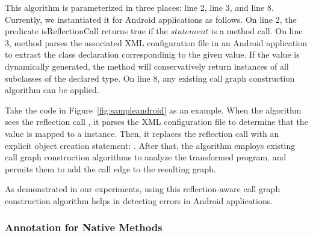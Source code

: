 This algorithm is parameterized in three places:
line 2, line 3, and line 8. Currently, we instantiated it
for Android applications as follows. On line 2,
the predicate isReflectionCall returns true
if the $statement$ is a  method call. On line 3, method
 parses the associated XML configuration
file in an Android application to extract the class declaration
 correspondinig to the given  value. If the 
value is dynamically generated, the method will conservatively
return instances of all subclasses of the declared type.
On line 8, any existing call graph construction algorithm can be applied.

Take the code in Figure~\ref{fig:sampleandroid} as an example.
When the algorithm sees the reflection call
, it
parses the XML configuration file to determine that the 
value is mapped to a  instance. Then, it
replaces the reflection call
with an explicit object creation statement: .
After that, the algorithm employs existing call graph construction
algorithms to analyze the transformed program, and permits them
to add the call edge  to the resulting graph.

As demonstrated in our experiments, using this reflection-aware call
graph construction algorithm helps in detecting errors
in Android applications.



\subsubsection{Annotation for Native Methods}
\label{sec:annotation}

